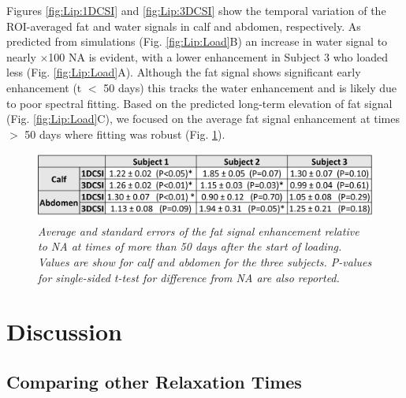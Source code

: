 Figures \ref{fig:Lip:1DCSI} and \ref{fig:Lip:3DCSI} show the temporal variation of the \ac{ROI}-averaged fat and water signals in calf and abdomen, respectively. As predicted from simulations (Fig. \ref{fig:Lip:Load}B) an increase in water signal to nearly $\times$100 \ac{NA} is evident, with a lower enhancement in Subject 3 who loaded less (Fig. \ref{fig:Lip:Load}A). Although the fat signal shows significant early enhancement (t $<$ 50 days) this tracks the water enhancement and is likely due to poor spectral fitting. Based on the predicted long-term elevation of fat signal (Fig. \ref{fig:Lip:Load}C), we focused on the average fat signal enhancement at times $>$ 50 days where fitting was robust (Fig. \ref{fig:Lip:Amp_Table}). 

\begin{figure}
    \centering
    \includegraphics[width=1\textwidth]{Figures/Lipid/Lipid_Table.png}
    \caption{\textit{Average and standard errors of the fat signal enhancement relative to \ac{NA} at times of more than 50 days after the start of loading. Values are show for calf and abdomen for the three subjects. P-values for single-sided t-test for difference from \ac{NA} are also reported.}}
    \label{fig:Lip:Amp_Table}
\end{figure}

\section{Discussion}

\subsection{Comparing other Relaxation Times}

